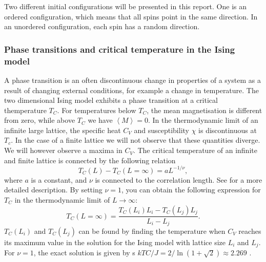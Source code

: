 Two different initial configurations will be presented in this report. One is an ordered configuration, which means that all spins point in the same direction. In an unordered configuration, each spin has a random direction. 

\subsubsection{Phase transitions and critical temperature in the Ising model}
A phase transition is an often discontinuous change in properties of a system as a result of changing external conditions, for example a change in temperature. The two dimensional Ising model exhibits a phase transition at a critical themperature $T_C$. For temperatures below $T_C$, the mean magnetisation is different from zero, while above $T_C$ we have $\left\langle M\right\rangle =0$. In the thermodynamic limit of an infinite large lattice, the specific heat $C_V$ and susceptibility $\chi$ is discontinuous at $T_c$. In the case of a finite lattice we will not observe that these quantities diverge. We will however observe a maxima in $C_V$. The critical temperature of an infinite and finite lattice is connected by the following relation    
\begin{equation}
T_C(L) - T_C(L=\infty) = aL^{-1/\nu},
\end{equation}
where $a$ is a constant, and $\nu$ is connected to the correlation length. See \cite{lecturenotes} for a more detailed description. 
By setting $\nu=1$, you can obtain the following expression for $T_C$ in the thermodynamic limit of $L\rightarrow \infty$:
\begin{equation}\label{eq:Tc}
T_C(L=\infty) = \frac{T_C(L_i)L_i-T_C(L_j)L_j}{L_i-L_j}.
\end{equation}
$T_C\left( L_i\right)$ and $T_C\left( L_j\right)$ can be found by finding the temperature when $C_V$ reaches its maximum value in the solution for the Ising model with lattice size $L_i$ and $L_j$. For $\nu=1$, the exact solution is given by s $kTC /J = 2/\ln{\left( 1+\sqrt{2}\right)} \approx 2.269$ \cite{tcExact}.

